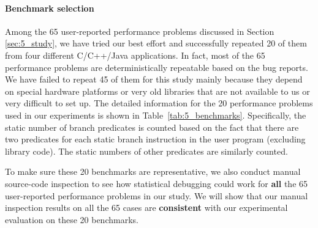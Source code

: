 \paragraph{Benchmark selection}
Among the 65 user-reported performance problems discussed in Section 
\ref{sec:5_study}, we have tried our best effort and successfully repeated 20
of them from four different C/C++/Java 
applications. In fact, most of the 65 performance problems are deterministically repeatable based on the bug reports.
We have failed to repeat 45 of them for this
study mainly because they depend on special hardware platforms or very
old libraries that are not available to us or very difficult to set up. 
The detailed information for the 20 performance problems used in our experiments 
is shown in Table~\ref{tab:5_benchmarks}.
Specifically, the static number of branch predicates is counted based on the 
fact that
there are two predicates for each static branch instruction in the user program
(excluding library code). The static numbers of other predicates are similarly
counted.

To make sure these 20 benchmarks are representative, we also conduct
manual source-code inspection to see how statistical debugging could work
for \textbf{all} the 65 user-reported performance problems in our study. 
We will show that our
manual inspection results on all the 65 cases are \textbf{consistent} with
our experimental evaluation on these 20 benchmarks. 

%




